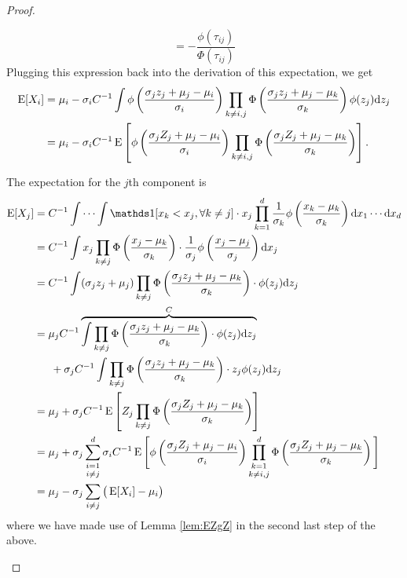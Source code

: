 \begin{proof}
\begin{enumerate}[label=(\roman*)]
\[    = - \frac{\phi(\tau_{ij})}{\Phi(\tau_{ij})}
  \] Plugging this expression back into the derivation of this expectation, we get
  \begin{align*}
  \operatorname{E}[X_i] 
  &= \mu_i -  \sigma_i C^{-1} \int 
  \phi \left( \frac{\sigma_j z_j + \mu_j - \mu_i}{\sigma_i} \right)
  \prod_{k \neq i,j} \Phi \left( \frac{\sigma_j z_j + \mu_j - \mu_k}{\sigma_k} \right) \phi (z_j) \text{d} z_j \\
  &= \mu_i - \sigma_i C^{-1} \operatorname{E} \left[ \phi \left( \frac{\sigma_j Z_j + \mu_j - \mu_i}{\sigma_i} \right)
  \prod_{k \neq i,j} \Phi \left( \frac{\sigma_j Z_j + \mu_j - \mu_k}{\sigma_k} \right) \right].
  \end{align*}
  
  The expectation for the $j$th component is
  \begin{align*}
    \E[X_j] 
    &= C^{-1} \idotsint \ind[x_k < x_j, \forall k \neq j] \cdot x_j  \prod_{k=1}^d \frac{1}{\sigma_k}\phi \left( \frac{x_k - \mu_k}{\sigma_k} \right) \d x_1 \cdots \d x_d \\
    &= C^{-1} \int x_j  \prod_{k \neq j} \Phi \left( \frac{x_j - \mu_k}{\sigma_k} \right) 
    \cdot \frac{1}{\sigma_j} \phi \left( \frac{x_j - \mu_j}{\sigma_j} \right) \d x_j  \\    
    &= C^{-1} \int (\sigma_j z_j + \mu_j)  \prod_{k \neq j} \Phi \left( \frac{\sigma_j z_j + \mu_j - \mu_k}{\sigma_k} \right) \cdot \phi (z_j) \d z_j  \\   
    &= \mu_j C^{-1} 
    \overbrace{
    \int  \prod_{k \neq j} \Phi \left( \frac{\sigma_j z_j + \mu_j - \mu_k}{\sigma_k} \right) \cdot \phi (z_j) \d z_j
    }^{C}  \\   
    &\phantom{==} + \sigma_j C^{-1} \int  \prod_{k \neq j} \Phi \left( \frac{\sigma_j z_j + \mu_j - \mu_k}{\sigma_k} \right) \cdot z_j \phi (z_j) \d z_j \\
    &= \mu_j + \sigma_j C^{-1} \E \left[ Z_j \prod_{k \neq j} \Phi \left( \frac{\sigma_j Z_j + \mu_j - \mu_k}{\sigma_k} \right) \right] \\
    &= \mu_j + \sigma_j  \mathop{\sum_{i=1}^d}_{i \neq j} \sigma_i C^{-1} \E \Bigg[ \phi \left( \frac{\sigma_j Z_j + \mu_j - \mu_i}{\sigma_i} \right) \mathop{\prod_{k=1}^d}_{k \neq i,j} \Phi \left( \frac{\sigma_j Z_j + \mu_j - \mu_k}{\sigma_k} \right) \Bigg] \\
    &= \mu_j - \sigma_j \sum_{i \neq j} \big(\E[X_i] - \mu_i \big)
  \end{align*}
  where we have made use of Lemma \ref{lem:EZgZ} in the second last step of the above.


\end{enumerate}
\end{proof}
